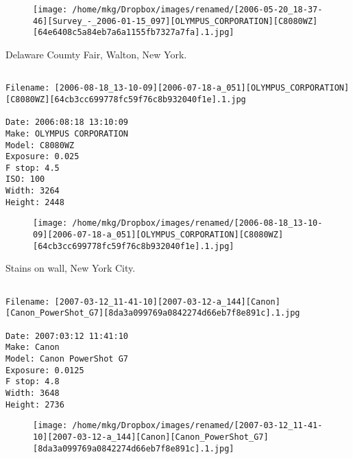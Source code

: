 \begin{figure}
\texttt{[image: /home/mkg/Dropbox/images/renamed/[2006-05-20\_18-37-46][Survey\_-\_2006-01-15\_097][OLYMPUS\_CORPORATION][C8080WZ][64e6408c5a84eb7a6a1155fb7327a7fa].1.jpg]}
\end{figure}
    
\clearpage
\onecolumn
\noindent Delaware Coumty Fair, Walton, New York.
\noindent
\begin{lstlisting}

Filename: [2006-08-18_13-10-09][2006-07-18-a_051][OLYMPUS_CORPORATION][C8080WZ][64cb3cc699778fc59f76c8b932040f1e].1.jpg

Date: 2006:08:18 13:10:09
Make: OLYMPUS CORPORATION
Model: C8080WZ
Exposure: 0.025
F stop: 4.5
ISO: 100
Width: 3264
Height: 2448
\end{lstlisting}
\clearpage

\begin{figure}
\texttt{[image: /home/mkg/Dropbox/images/renamed/[2006-08-18\_13-10-09][2006-07-18-a\_051][OLYMPUS\_CORPORATION][C8080WZ][64cb3cc699778fc59f76c8b932040f1e].1.jpg]}
\end{figure}
    
\clearpage
\onecolumn
\noindent Stains on wall, New York City.
\noindent
\begin{lstlisting}

Filename: [2007-03-12_11-41-10][2007-03-12-a_144][Canon][Canon_PowerShot_G7][8da3a099769a0842274d66eb7f8e891c].1.jpg

Date: 2007:03:12 11:41:10
Make: Canon
Model: Canon PowerShot G7
Exposure: 0.0125
F stop: 4.8
Width: 3648
Height: 2736
\end{lstlisting}
\clearpage

\begin{figure}
\texttt{[image: /home/mkg/Dropbox/images/renamed/[2007-03-12\_11-41-10][2007-03-12-a\_144][Canon][Canon\_PowerShot\_G7][8da3a099769a0842274d66eb7f8e891c].1.jpg]}
\end{figure}
    
